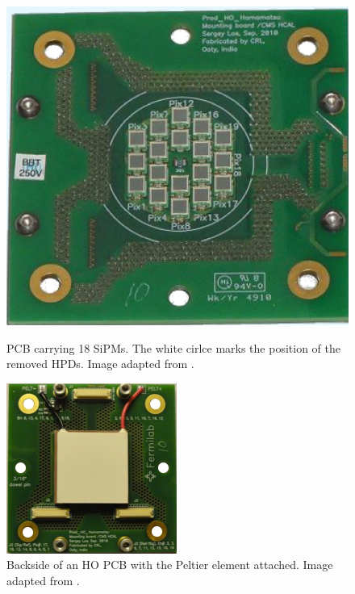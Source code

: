 \begin{figure}[htbp]
\centering
\begin{minipage}[t]{0.475\textwidth}
\includegraphics[width=\textwidth]{Figures/kuensken/pcbSipm.png}
\caption{PCB carrying 18 SiPMs. The white cirlce marks the position of the removed HPDs. Image adapted from \cite{beniCalor}.}
\label{kuenskensipmPcb}
\end{minipage}
\hspace{1cm}
\begin{minipage}[t]{0.435\textwidth}
\includegraphics[width=\textwidth]{Figures/kuensken/pcbPeltier.png}
\caption{Backside of an HO PCB with the Peltier element attached. Image adapted from \cite{beniCalor}.}
\label{kuenskenpeltier}
\end{minipage}
\end{figure}
